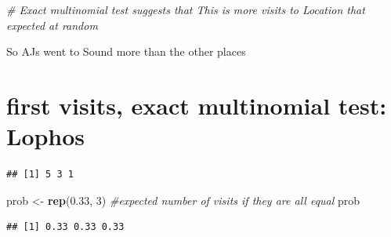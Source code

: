 \documentclass[]{article}
\newenvironment{Shaded}{\begin{snugshade}}{\end{snugshade}}
\newcommand{\KeywordTok}[1]{\textcolor[rgb]{0.13,0.29,0.53}{\textbf{{#1}}}}
\newcommand{\DecValTok}[1]{\textcolor[rgb]{0.00,0.00,0.81}{{#1}}}
\newcommand{\FloatTok}[1]{\textcolor[rgb]{0.00,0.00,0.81}{{#1}}}
\newcommand{\StringTok}[1]{\textcolor[rgb]{0.31,0.60,0.02}{{#1}}}
\newcommand{\CommentTok}[1]{\textcolor[rgb]{0.56,0.35,0.01}{\textit{{#1}}}}
\newcommand{\NormalTok}[1]{{#1}}
\begin{document}
\begin{Shaded}
\begin{Highlighting}[]
\CommentTok{# Exact multinomial test suggests that This is more visits to Location that expected at random}
\end{Highlighting}
\end{Shaded}

So AJs went to Sound more than the other places

\section{first visits, exact multinomial test:
Lophos}\label{first-visits-exact-multinomial-test-lophos}

\begin{Shaded}
\end{Shaded}

\begin{verbatim}
## [1] 5 3 1
\end{verbatim}

\begin{Shaded}
\begin{Highlighting}[]
\NormalTok{prob <-}\StringTok{ }\KeywordTok{rep}\NormalTok{(}\FloatTok{0.33}\NormalTok{, }\DecValTok{3}\NormalTok{) }\CommentTok{#expected number of visits if they are all equal}
\NormalTok{prob }
\end{Highlighting}
\end{Shaded}

\begin{verbatim}
## [1] 0.33 0.33 0.33
\end{verbatim}
\end{document}
